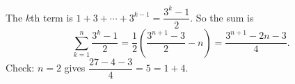 The $k$th term is $1+3+\cdots+3^{k-1}=\dfrac{3^k-1}{2}$. So the sum is
\[\sum_{k=1}^{n}\dfrac{3^k-1}{2}=\dfrac12\left(\dfrac{3^{n+1}-3}{2}-n\right)=\boxed{\dfrac{3^{n+1}-2n-3}{4}}.\]
Check: $n=2$ gives $\dfrac{27-4-3}{4}=5=1+4$.
